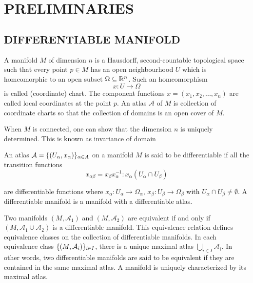\chapter{PRELIMINARIES}

\section{DIFFERENTIABLE MANIFOLD}

\begin{definition}
	A manifold $M$ of dimension $n$ is a Hausdorff, second-countable topological space such that every point $p \in M$ has an open neighbourhood $U$ which is homeomorphic to an open subset $\Omega \subseteq \mathbb{R}^n$. Such an homeomorphism
	$$
		x: U \to \Omega
	$$ 
	is called (coordinate) chart. The component functions $x = (x_1, x_2, ..., x_n)$ are called local coordinates at the point $p$. An atlas $\mathcal{A}$ of $M$ is collection of coordinate charts so that the collection of domains is an open cover of $M$.
\end{definition}

\begin{remark}
	When $M$ is connected, one can show that the dimension $n$ is uniquely determined. This is known as invariance of domain
\end{remark}

\begin{definition}
	An atlas $\mathcal{A} = \{(U_\alpha, x_\alpha)\}_{\alpha \in A}$ on a manifold $M$ is said to be differentiable if all the transition functions
	$$
		x_{\alpha \beta} = x_\beta x_\alpha^{-1}: x_\alpha (U_\alpha \cap U_\beta)
	$$
	
	are differentiable functions where $x_\alpha: U_\alpha \to \Omega_\alpha$, $x_\beta: U_\beta \to \Omega_\beta$ with $U_\alpha \cap U_\beta \neq \emptyset$. A differentiable manifold is a manifold with a differentiable atlas.
\end{definition}

\begin{remark}
	Two manifolds $(M, \mathcal{A}_1)$ and $(M, \mathcal{A}_2)$ are equivalent if and only if $(M, \mathcal{A}_1 \cup \mathcal{A}_2)$ is a differentiable manifold. This equivalence relation defines equivalence classes on the collection of differentiable manifolds. In each equivalence class $\{(M, \mathcal{A}_i)\}_{i \in I}$, there is a unique maximal atlas $\bigcup_{i \in I} \mathcal{A}_i$. In other words, two differentiable manifolds are said to be equivalent if they are contained in the same maximal atlas. A manifold is uniquely characterized by its maximal atlas.
\end{remark}

